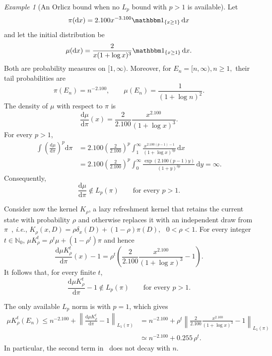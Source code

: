 \documentclass[11pt]{article}
\theoremstyle{plain}
\theoremstyle{remark}
\newtheorem{example}{Example}
\begin{document}
\begin{example}[An Orlicz bound when no $L_p$ bound with $p>1$ is available]\label{ex:heavyTailOrlicz}
Let
\[
    \pi(\mathrm dx)
    =
    2.100x^{-3.100}\mathbbm 1_{\{x\geq1\}}\,\mathrm dx
\]
and let the initial distribution be
\[
    \mu(\mathrm dx)
    =
    \frac{2}{x(1+\log x)^3}
    \mathbbm 1_{\{x\geq1\}}\,\mathrm dx .
\]
Both are probability measures on $[1,\infty)$. Moreover, for $E_n=[n,\infty), n\geq1,$
their tail probabilities are
\[
    \pi(E_n)=n^{-2.100},
    \qquad
    \mu(E_n)=\frac{1}{(1+\log n)^2}.
\]
The density of $\mu$ with respect to $\pi$ is
\[
    \frac{\mathrm d\mu}{\mathrm d\pi}(x)
    =
    \frac{2}{2.100}
    \frac{x^{2.100}}{(1+\log x)^3}.
\]
For every $p>1$,
\begin{align*}
    \int
    \left(
        \frac{\mathrm d\mu}{\mathrm d\pi}
    \right)^p
    \mathrm d\pi
    &=
    2.100\left(\frac{2}{2.100}\right)^p
    \int_1^\infty
    \frac{x^{2.100(p-1)-1}}
         {(1+\log x)^{3p}}
    \,\mathrm dx\\
    &=
    2.100\left(\frac{2}{2.100}\right)^p
    \int_0^\infty
    \frac{\exp(2.100(p-1)y)}
         {(1+y)^{3p}}
    \,\mathrm dy =\infty.
\end{align*}
Consequently,
\[
    \frac{\mathrm d\mu}{\mathrm d\pi}
    \notin L_p(\pi)
    \qquad\text{for every }p>1.
\]


Consider now the kernel \(K_\rho\), a lazy refreshment kernel that retains the current state with probability \(\rho\) and otherwise replaces it with an independent draw from \(\pi\)~\cite[Section 1.3]{levin2017markov}, \textit{i.e.}, $
    K_\rho(x,D)
    =
    \rho\delta_x(D)+(1-\rho)\pi(D),
    \text{ } 0<\rho<1.$ For every integer $t\in\mathbb N_0$,
$
    \mu K_\rho^t
    =
    \rho^t\mu+(1-\rho^t)\pi$ and hence
\[
    \frac{\mathrm d\mu K_\rho^t}{\mathrm d\pi}(x)-1
    =
    \rho^t
    \left(
        \frac{2}{2.100}
        \frac{x^{2.100}}{(1+\log x)^3}
        -1
    \right).
\]
It follows that, for every finite $t$,
\[
    \frac{\mathrm d\mu K_\rho^t}{\mathrm d\pi}-1
    \notin L_p(\pi)
    \qquad\text{for every }p>1.
\]

The only available $L_p$ norm is with $p=1$, which gives
\begin{align}
    \mu K_\rho^t(E_n)
    \leq
    n^{-2.100}
    +
    \left\lVert
        \frac{\mathrm d\mu K_\rho^t}{\mathrm d\pi}-1
    \right\rVert_{L_1(\pi)} &=
    n^{-2.100}
    +
    \rho^t
    \left\lVert
        \frac{2}{2.100}
        \frac{x^{2.100}}{(1+\log x)^3}
        -1
    \right\rVert_{L_1(\pi)}\\
    &\simeq
    n^{-2.100}+0.255 \,\rho^t. \label{eq:heavyTailL1NormDecay}
\end{align}
In particular, the second term in~ does
not decay with $n$.


\end{example}
\end{document}
